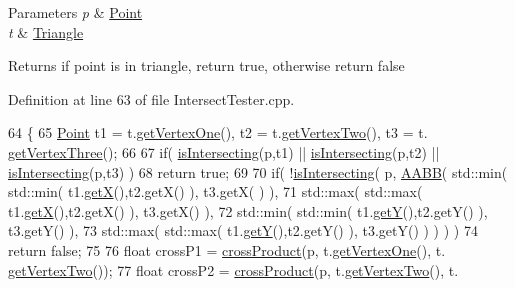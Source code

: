 \begin{DoxyParams}{Parameters}
{\em p} & \hyperlink{class_point}{Point} \\
\hline
{\em t} & \hyperlink{class_triangle}{Triangle} \\
\hline
\end{DoxyParams}
\begin{DoxyReturn}{Returns}
if point is in triangle, return true, otherwise return false 
\end{DoxyReturn}


Definition at line 63 of file Intersect\+Tester.\+cpp.


\begin{DoxyCode}
64 \{
65     \hyperlink{class_point}{Point} t1 = t.\hyperlink{class_triangle_a88a35d0b66c9636a9be88adc88d003aa}{getVertexOne}(), t2 = t.\hyperlink{class_triangle_ac1ae7463f829bcf377fd926b1ad10cac}{getVertexTwo}(), t3 = t.
      \hyperlink{class_triangle_aed6ceca804b35da95d3d3c930de41e91}{getVertexThree}();
66 
67     \textcolor{keywordflow}{if}( \hyperlink{class_intersect_tester_a7710e17ff7d2e229059f23b9429213f5}{isIntersecting}(p,t1) || \hyperlink{class_intersect_tester_a7710e17ff7d2e229059f23b9429213f5}{isIntersecting}(p,t2) || 
      \hyperlink{class_intersect_tester_a7710e17ff7d2e229059f23b9429213f5}{isIntersecting}(p,t3) )
68         \textcolor{keywordflow}{return} \textcolor{keyword}{true};
69 
70     \textcolor{keywordflow}{if}( !\hyperlink{class_intersect_tester_a7710e17ff7d2e229059f23b9429213f5}{isIntersecting}( p, \hyperlink{class_a_a_b_b}{AABB}( std::min( std::min( t1.\hyperlink{class_point_a29c44ec7c7279e02629645a06cdaf7d5}{getX}(),t2.getX() ), t3.getX(
      ) ),
71                                  std::max( std::max( t1.\hyperlink{class_point_a29c44ec7c7279e02629645a06cdaf7d5}{getX}(),t2.getX() ), t3.getX() ),
72                                  std::min( std::min( t1.\hyperlink{class_point_a2371ffadbe245d12a8f556d0a976521b}{getY}(),t2.getY() ), t3.getY() ),
73                                  std::max( std::max( t1.\hyperlink{class_point_a2371ffadbe245d12a8f556d0a976521b}{getY}(),t2.getY() ), t3.getY() ) ) ) )
74             \textcolor{keywordflow}{return} \textcolor{keyword}{false};
75 
76     \textcolor{keywordtype}{float} crossP1 = \hyperlink{class_intersect_tester_a1b966d15da1de1fab5350c8e81e0b70f}{crossProduct}(p, t.\hyperlink{class_triangle_a88a35d0b66c9636a9be88adc88d003aa}{getVertexOne}(), t.
      \hyperlink{class_triangle_ac1ae7463f829bcf377fd926b1ad10cac}{getVertexTwo}());
77     \textcolor{keywordtype}{float} crossP2 = \hyperlink{class_intersect_tester_a1b966d15da1de1fab5350c8e81e0b70f}{crossProduct}(p, t.\hyperlink{class_triangle_ac1ae7463f829bcf377fd926b1ad10cac}{getVertexTwo}(), t.

\end{DoxyCode}
